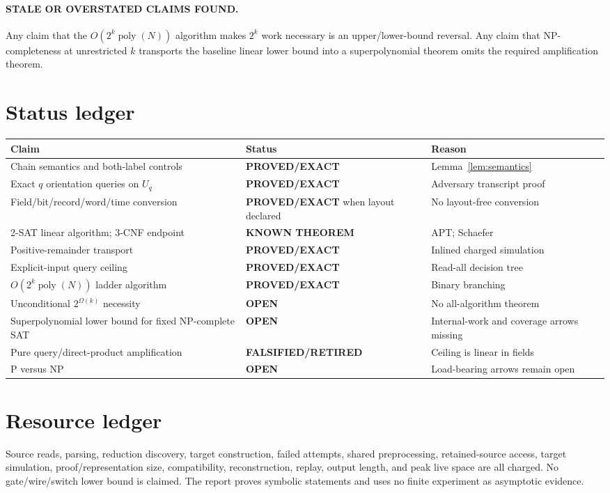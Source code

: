 \documentclass[11pt]{article}
\newcommand{\EXACT}{\textbf{PROVED/EXACT}}
\newcommand{\KNOWN}{\textbf{KNOWN THEOREM}}
\newcommand{\OPEN}{\textbf{OPEN}}
\begin{document}
\paragraph{STALE OR OVERSTATED CLAIMS FOUND.}
Any claim that the $O(2^k\operatorname{poly}(N))$ algorithm makes $2^k$ work
necessary is an upper/lower-bound reversal.  Any claim that NP-completeness at
unrestricted $k$ transports the baseline linear lower bound into a
superpolynomial theorem omits the required amplification theorem.

\section*{Status ledger}
\begin{center}
\begin{tabular}{p{.38\linewidth}p{.23\linewidth}p{.29\linewidth}}
\toprule
Claim & Status & Reason \\
\midrule
Chain semantics and both-label controls & \EXACT & Lemma~\ref{lem:semantics} \\
Exact $q$ orientation queries on $U_q$ & \EXACT & Adversary transcript proof \\
Field/bit/record/word/time conversion & \EXACT{} when layout declared & No
layout-free conversion \\
2-SAT linear algorithm; 3-CNF endpoint & \KNOWN & APT; Schaefer \\
Positive-remainder transport & \EXACT & Inlined charged simulation \\
Explicit-input query ceiling & \EXACT & Read-all decision tree \\
$O(2^k\operatorname{poly}(N))$ ladder algorithm & \EXACT & Binary branching \\
Unconditional $2^{\Omega(k)}$ necessity & \OPEN & No all-algorithm theorem \\
Superpolynomial lower bound for fixed NP-complete SAT & \OPEN & Internal-work
and coverage arrows missing \\
Pure query/direct-product amplification & \textbf{FALSIFIED/}\newline\textbf{RETIRED} & Ceiling is linear in fields \\
P versus NP & \OPEN & Load-bearing arrows remain open \\
\bottomrule
\end{tabular}
\end{center}

\section*{Resource ledger}
Source reads, parsing, reduction discovery, target construction, failed
attempts, shared preprocessing, retained-source access, target simulation,
proof/representation size, compatibility, reconstruction, replay, output
length, and peak live space are all charged.  No gate/wire/switch lower bound is
claimed.  The report proves symbolic statements and uses no finite experiment
as asymptotic evidence.
\end{document}
